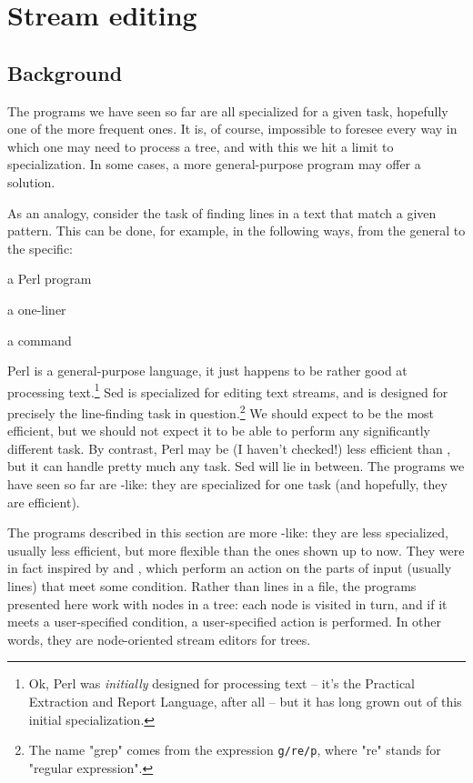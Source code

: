 
\section[sct_ed]{Stream editing}


\subsection{Background}

The programs we have seen so far are all specialized for a given task,
hopefully one of the more frequent ones. It is, of course, impossible to
foresee every way in which one may need to process a tree, and with this we hit
a limit to specialization. In some cases, a more general-purpose program may
offer a solution.

As an analogy, consider the task of finding lines in a text that match a
given pattern. This can be done, for example, in the following ways, from the
general to the specific:

\startitemize
	\item a Perl program
	\item a  one-liner
	\item a  command
\stopitemize

Perl is a general-purpose language, it just happens to be rather good at
processing text.\footnote{Ok, Perl was {\em initially} designed for processing
text -- it's the Practical Extraction and Report Language, after all -- but it
has long grown out of this initial specialization.} Sed is specialized for
editing text streams, and  is designed for precisely the line-finding
task in question.\footnote{The name "grep" comes from the  expression
{\tt g/re/p}, where "re" stands for "regular expression".} We should expect
 to be the most efficient, but we should not expect it to be able to
perform any significantly different task.  By contrast, Perl may be (I haven't
checked!) less efficient than , but it can handle pretty much any
task. Sed will lie in between. The \nutils{} programs we have seen so far are
-like: they are specialized for one task (and hopefully, they are
efficient).

The programs described in this section are more -like: they are
less specialized, usually less efficient, but more flexible than the ones shown
up to now. They were in fact inspired by  and ,
which perform an action on the parts of input (usually lines) that meet some
condition. Rather than lines in a file, the programs presented here work with
nodes in a tree: each node is visited in turn, and if it meets a user-specified
condition, a user-specified action is performed. In other words, they are
node-oriented stream editors for trees.

